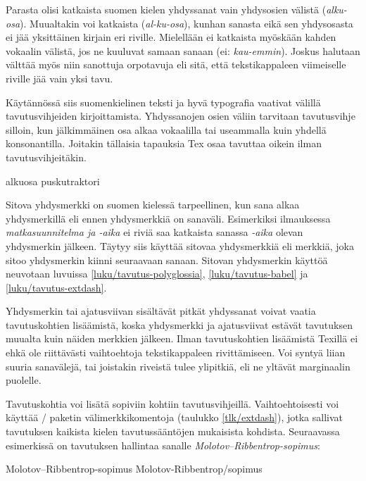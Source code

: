 Parasta olisi katkaista suomen kielen yhdyssanat vain yhdysosien välistä
(\emph{alku-osa}). Muualtakin voi katkaista (\emph{al-ku-osa}), kunhan
sanasta eikä sen yhdysosasta ei jää yksittäinen kirjain eri riville.
Mielellään ei katkaista myöskään kahden vokaalin välistä, jos ne
kuuluvat samaan sanaan (ei: \emph{kau-emmin}). Joskus halutaan välttää
myös niin sanottuja orpotavuja eli sitä, että tekstikappaleen
viimeiselle riville jää vain yksi tavu.

Käytännössä siis suomenkielinen teksti ja hyvä typografia vaativat
välillä tavutusvihjeiden kirjoittamista. Yhdyssanojen osien väliin
tarvitaan tavutusvihje silloin, kun jälkimmäinen osa alkaa vokaalilla
tai useammalla kuin yhdellä konsonantilla. Joitakin tällaisia tapauksia
Tex osaa tavuttaa oikein ilman tavutusvihjeitäkin.

\komentoi{-}
\begin{koodilohkosis}
alku\-osa pusku\-traktori
\end{koodilohkosis}

\noindent
Sitova yhdysmerkki on suomen kielessä tarpeellinen, kun sana alkaa
yhdysmerkillä eli ennen yhdysmerkkiä on sanaväli. Esimerkiksi
ilmauksessa \emph{matkasuunnitelma ja \mbox{-aika}} ei riviä saa
katkaista sanassa \emph{\mbox{-aika}} olevan yhdysmerkin jälkeen. Täytyy
siis käyttää sitovaa yhdysmerkkiä eli merkkiä, joka sitoo yhdysmerkin
kiinni seuraavaan sanaan. Sitovan yhdysmerkin käyttöä neuvotaan luvuissa
\ref{luku/tavutus-polyglossia}, \ref{luku/tavutus-babel} ja
\ref{luku/tavutus-extdash}.

Yhdysmerkin tai ajatusviivan sisältävät pitkät yhdyssanat voivat vaatia
tavutuskohtien lisäämistä, koska yhdysmerkki ja ajatusviivat estävät
tavutuksen muualta kuin näiden merkkien jälkeen. Ilman tavutuskohtien
lisäämistä Texillä ei ehkä ole riittävästi vaihtoehtoja tekstikappaleen
rivittämiseen. Voi syntyä liian suuria sanavälejä, tai joistakin
riveistä tulee ylipitkiä, eli ne yltävät marginaalin puolelle.

Tavutuskohtia voi lisätä sopiviin kohtiin tavutusvihjeillä.
Vaihtoehtoisesti voi käyttää \-/ paketin
välimerkkikomentoja (taulukko \ref{tlk/extdash}), jotka sallivat
tavutuksen kaikista kielen tavutussääntöjen mukaisista kohdista.
Seuraavassa esimerkissä on tavutuksen hallintaa sanalle
\emph{Molo\-tov--Ribben\-trop-sopi\-mus}:

\komentoi{-}
\komentoi{--}
\komentoi{-/}
\begin{koodilohkosis}
Molo\-tov--Ribben\-trop-sopi\-mus %
Molotov\--Ribben\-trop\-/sopimus  %
\end{koodilohkosis}

